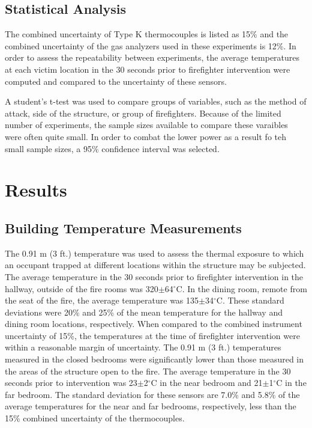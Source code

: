 \documentclass[12pt,oneside]{article}
\begin{document}
\subsection{Statistical Analysis}

The combined uncertainty of Type K thermocouples is listed as 15\% \cite{Blevins:1999,Pitts_etal_TC} and the combined uncertainty of the gas analyzers used in these experiments is 12\%. In order to assess the repeatability between experiments, the average temperatures at each victim location in the 30 seconds prior to firefighter intervention were computed and compared to the uncertainty of these sensors. 

A student's t-test was used to compare groups of variables, such as the method of attack, side of the structure, or group of firefighters. Because of the limited number of experiments, the sample sizes available to compare these varaibles were often quite small. In order to combat the lower power as a result fo teh small sample sizes, a 95\% confidence interval was selected.

\section{Results}

\subsection{Building Temperature Measurements}
\label{subsec:temps}
The 0.91 m (3 ft.) temperature was used to assess the thermal exposure to which an occupant trapped at different locations within the structure may be subjected. The average temperature in the 30 seconds prior to firefighter intervention in the hallway, outside of the fire rooms was 320$\pm$64$^{\circ}$C. In the dining room, remote from the seat of the fire, the average temperature was 135$\pm$34$^{\circ}$C. These standard deviations were 20\% and 25\% of the mean temperature for the hallway and dining room locations, respectively. When compared to the combined instrument uncertainty of 15\%, the temperatures at the time of firefighter intervention were within a reasonable margin of uncertainty. The 0.91 m (3 ft.) temperatures measured in the closed bedrooms were significantly lower than those measured in the areas of the structure open to the fire. The average temperature in the 30 seconds prior to intervention was 23$\pm$2$^{\circ}$C in the near bedroom and 21$\pm$1$^{\circ}$C in the far bedroom. The standard deviation for these sensors are 7.0\% and 5.8\% of the average temperatures for the near and far bedrooms, respectively, less than the 15\% combined uncertainty of the thermocouples.
\end{document}
